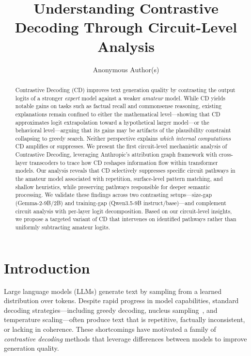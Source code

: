 \documentclass[11pt]{article}
\title{Understanding Contrastive Decoding Through Circuit-Level Analysis}
\author{
  Anonymous Author(s)
}
\begin{document}
\maketitle

\begin{abstract}
Contrastive Decoding (CD) improves text generation quality by contrasting the output logits of a stronger \emph{expert} model against a weaker \emph{amateur} model. While CD yields notable gains on tasks such as factual recall and commonsense reasoning, existing explanations remain confined to either the mathematical level---showing that CD approximates logit extrapolation toward a hypothetical larger model---or the behavioral level---arguing that its gains may be artifacts of the plausibility constraint collapsing to greedy search. Neither perspective explains \emph{which internal computations} CD amplifies or suppresses. We present the first circuit-level mechanistic analysis of Contrastive Decoding, leveraging Anthropic's attribution graph framework with cross-layer transcoders to trace how CD reshapes information flow within transformer models. Our analysis reveals that CD selectively suppresses specific circuit pathways in the amateur model associated with repetition, surface-level pattern matching, and shallow heuristics, while preserving pathways responsible for deeper semantic processing. We validate these findings across two contrasting setups---size-gap (Gemma-2-9B/2B) and training-gap (Qwen3.5-9B instruct/base)---and complement circuit analysis with per-layer logit decomposition. Based on our circuit-level insights, we propose a targeted variant of CD that intervenes on identified pathways rather than uniformly subtracting amateur logits.
\end{abstract}

\section{Introduction}
\label{sec:intro}

Large language models (LLMs) generate text by sampling from a learned distribution over tokens. Despite rapid progress in model capabilities, standard decoding strategies---including greedy decoding, nucleus sampling~\citep{holtzman2020curious}, and temperature scaling---often produce text that is repetitive, factually inconsistent, or lacking in coherence. These shortcomings have motivated a family of \emph{contrastive decoding} methods that leverage differences between models to improve generation quality.
\end{document}
